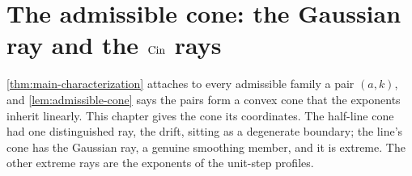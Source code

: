 %
%
%

\chapter{The admissible cone: the Gaussian ray and the $\operatorname{Cin}$ rays}
\label{ch:cone}

\ref{thm:main-characterization} attaches to every admissible family a pair $(a,k)$, and
\ref{lem:admissible-cone} says the pairs form a convex cone that the exponents inherit
linearly. This chapter gives the cone its coordinates. The half-line cone had one
distinguished ray, the drift, sitting as a degenerate boundary; the line's cone has the
Gaussian ray, a genuine smoothing member, and it is extreme. The other extreme rays are the
exponents of the unit-step profiles.

